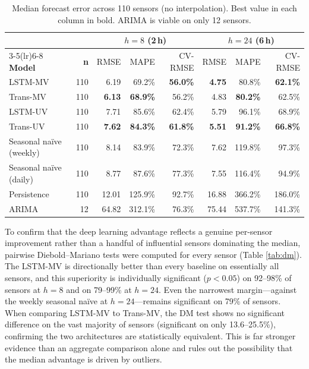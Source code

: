 \documentclass[journal,sensors,submit,pdftex,moreauthors]{Definitions/mdpi}
\begin{document}
\begin{table}[htbp]
    \caption{Median forecast error across 110 sensors (no interpolation). Best value in each column in bold. ARIMA is viable on only 12 sensors.}
    \label{tab:baseline}
    \begin{tabular}{@{}lrrrrrrr@{}}
        \toprule
        & & \multicolumn{3}{c}{$h=8$ (2\,h)} & \multicolumn{3}{c}{$h=24$ (6\,h)} \\
        \cmidrule(lr){3-5}\cmidrule(lr){6-8}
        \textbf{Model} & \textbf{n} & RMSE & MAPE & CV-RMSE & RMSE & MAPE & CV-RMSE \\
        \midrule
        LSTM-MV                  & 110 & 6.19  & 69.2\%  & \textbf{56.0\%} & \textbf{4.75}  & 80.8\%  & \textbf{62.1\%} \\
        Trans-MV                 & 110 & \textbf{6.13}  & \textbf{68.9\%}  & 56.2\% & 4.83  & \textbf{80.2\%}  & 62.5\% \\
        LSTM-UV                  & 110 & 7.71  & 85.6\%  & 62.4\% & 5.79  & 96.1\%  & 68.9\% \\
        Trans-UV                 & 110 & \textbf{7.62}  & \textbf{84.3\%}  & \textbf{61.8\%} & \textbf{5.51}  & \textbf{91.2\%}  & \textbf{66.8\%} \\
        Seasonal na\"ive (weekly)& 110 & 8.14  & 83.9\%  & 72.3\% & 7.62  & 119.8\% & 97.3\% \\
        Seasonal na\"ive (daily) & 110 & 8.77  & 87.6\%  & 77.3\% & 7.55  & 116.4\% & 94.9\% \\
        Persistence              & 110 & 12.01 & 125.9\% & 92.7\% & 16.88 & 366.2\% & 186.0\% \\
        ARIMA                    & 12  & 64.82 & 312.1\% & 76.3\% & 75.44 & 537.7\% & 141.3\% \\
        \bottomrule
    \end{tabular}
\end{table}

To confirm that the deep learning advantage reflects a genuine per-sensor improvement rather than a handful of influential sensors dominating the median, pairwise Diebold--Mariano tests were computed for every sensor (Table \ref{tab:dm}). The LSTM-MV is directionally better than every baseline on essentially all sensors, and this superiority is individually significant ($p<0.05$) on 92--98\% of sensors at $h=8$ and on 79--99\% at $h=24$. Even the narrowest margin---against the weekly seasonal na\"ive at $h=24$---remains significant on 79\% of sensors. When comparing LSTM-MV to Trans-MV, the DM test shows no significant difference on the vast majority of sensors (significant on only 13.6--25.5\%), confirming the two architectures are statistically equivalent. This is far stronger evidence than an aggregate comparison alone and rules out the possibility that the median advantage is driven by outliers.
\end{document}
